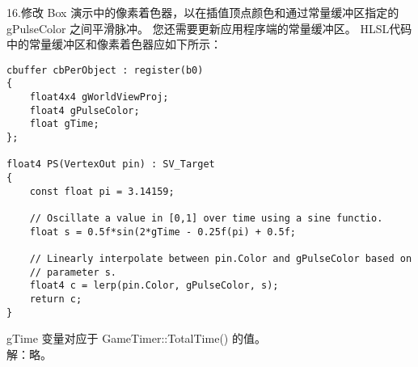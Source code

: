 \begin{flushleft}
16.修改 Box 演示中的像素着色器，以在插值顶点颜色和通过常量缓冲区指定的 gPulseColor 之间平滑脉冲。 您还需要更新应用程序端的常量缓冲区。 HLSL代码中的常量缓冲区和像素着色器应如下所示：
\end{flushleft}
\begin{lstlisting}
cbuffer cbPerObject : register(b0)
{
    float4x4 gWorldViewProj;
    float4 gPulseColor;
    float gTime;
};

float4 PS(VertexOut pin) : SV_Target
{
    const float pi = 3.14159;

    // Oscillate a value in [0,1] over time using a sine functio.
    float s = 0.5f*sin(2*gTime - 0.25f(pi) + 0.5f;

    // Linearly interpolate between pin.Color and gPulseColor based on
    // parameter s.
    float4 c = lerp(pin.Color, gPulseColor, s);
    return c;
}
\end{lstlisting}
\begin{flushleft}
gTime 变量对应于 GameTimer::TotalTime() 的值。\\
解：略。
\end{flushleft}
